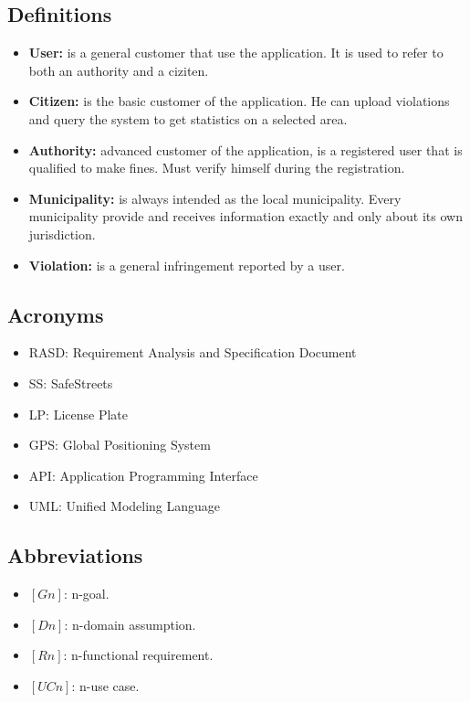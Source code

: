 \documentclass[a4paper, hidelinks, 12pt]{report}
\begin{document}
	\subsection{Definitions}\label{subsec:definitions}
	\begin{itemize}
		\item \textbf{User:} is a general customer that use the application. It is used to refer to both an authority and a ciziten.
		\item \textbf{Citizen:} is the basic customer of the application. He can upload violations and query the system to get statistics on a selected area.
		\item \textbf{Authority:} advanced customer of the application, is a registered user that is qualified to make fines. Must verify himself during the registration.
		\item \textbf{Municipality:} is always intended as the local municipality. Every municipality provide and receives information exactly and only about its own jurisdiction.
		\item \textbf{Violation:} is a general infringement reported by a user.
	\end{itemize}

	\subsection{Acronyms}\label{subsec:acronyms}
	\begin{itemize}
		\item RASD: Requirement Analysis and Specification Document
		\item SS: SafeStreets
		\item LP: License Plate
		\item GPS: Global Positioning System
		\item API: Application Programming Interface
		\item UML: Unified Modeling Language
	\end{itemize}

	\subsection{Abbreviations}\label{subsec:abbreviations}
	\begin{itemize}
		\item $[Gn]$: n-goal.
		\item $[Dn]$: n-domain assumption.
		\item $[Rn]$: n-functional requirement.
		\item $[UCn]$: n-use case.
	\end{itemize}
\end{document}
